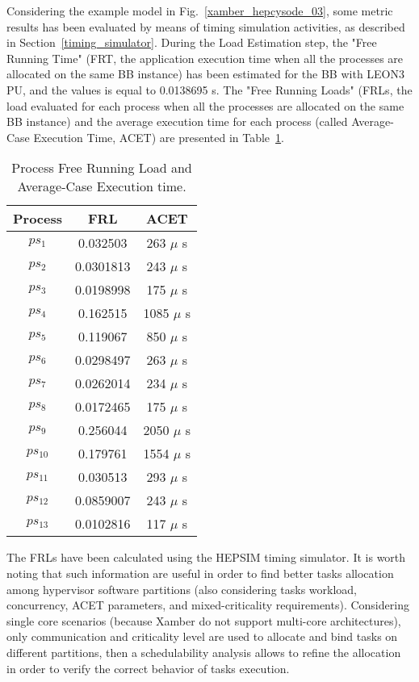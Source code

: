 %
Considering the example model in Fig.~\ref{xamber_hepcysode_03}, some metric results has been evaluated by means of timing simulation activities, as described in Section~\ref{timing_simulator}. During the Load Estimation step, the "Free Running Time" (FRT, the application execution time when all the processes are allocated on the same BB instance) has been estimated for the BB with LEON3 PU, and the values is equal to 0.0138695 s. The "Free Running Loads" (FRLs, the load evaluated for each process when all the processes are allocated on the same BB instance) and the average execution time for each process (called  Average-Case Execution Time, ACET) are presented in Table~\ref{load_proc_rt_leon3}.  \par
%
\begin{table}[htbp]
\caption{Process Free Running Load and Average-Case Execution time.}
\scriptsize
\begin{center}
\begin{tabular}{c||c|c} %
\hline
Process & FRL & ACET  \\
\hline\hline
 $ps_1$    & 0.032503   &  263 $\mu$ s  \\ \hline   %
 $ps_2$    & 0.0301813  &  243 $\mu$ s  \\ \hline   %
 $ps_3$    & 0.0198998  &  175 $\mu$ s \\ \hline   %
 $ps_4$    & 0.162515   &  1085 $\mu$ s  \\ \hline  %
 $ps_5$    & 0.119067   &  850 $\mu$ s  \\ \hline  %
 $ps_6$    & 0.0298497  &  263 $\mu$ s  \\ \hline  %
 $ps_7$    & 0.0262014  &  234 $\mu$ s  \\ \hline  %
 $ps_8$    & 0.0172465  &  175 $\mu$ s \\ \hline  %
 $ps_9$    & 0.256044   &  2050 $\mu$ s \\ \hline  %
 $ps_{10}$ & 0.179761   &  1554 $\mu$ s \\ \hline  %
 $ps_{11}$ & 0.030513   &  293 $\mu$ s \\ \hline  %
 $ps_{12}$ & 0.0859007  &  243 $\mu$ s \\ \hline  %
 $ps_{13}$ & 0.0102816  &  117 $\mu$ s \\         %
\hline\hline
\end{tabular}
\label{load_proc_rt_leon3}
\end{center}
\end{table}
%
The FRLs have been calculated using the HEPSIM timing simulator.
It is worth noting that such information are useful in order to find better tasks allocation among hypervisor software partitions (also considering tasks workload, concurrency, ACET parameters, and mixed-criticality requirements). Considering single core scenarios (because Xamber do not support multi-core architectures), only communication and criticality level are used to allocate and bind tasks on different partitions, then a schedulability analysis allows to refine the allocation in order to verify the correct behavior of tasks execution.
%
